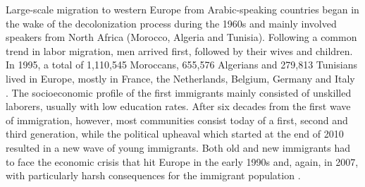\documentclass[output=paper]{langsci/langscibook}
\begin{document}
Large-scale migration to western Europe from Arabic-speaking countries began in the wake of the decolonization process during the 1960s and mainly involved speakers from North Africa (Morocco, Algeria and Tunisia). Following a common trend in labor migration, men arrived first, followed by their wives and children. In 1995, a total of 1,110,545 Moroccans, 655,576 Algerians and 279,813 Tunisians lived in Europe, mostly in France, the Netherlands, Belgium, Germany and Italy \citep[259--260]{BoumansdeRuiter2002}. The socioeconomic profile of the first immigrants mainly consisted of unskilled laborers, usually with low education rates. After six decades from the first wave of immigration, however, most communities consist today of a first, second and third generation, while the political upheaval which started at the end of 2010 resulted in a new wave of young immigrants. Both old and new immigrants had to face the economic crisis that hit Europe in the early 1990s and, again, in 2007, with particularly harsh consequences for the immigrant population \citep[261]{BoumansdeRuiter2002}.
\end{document}
